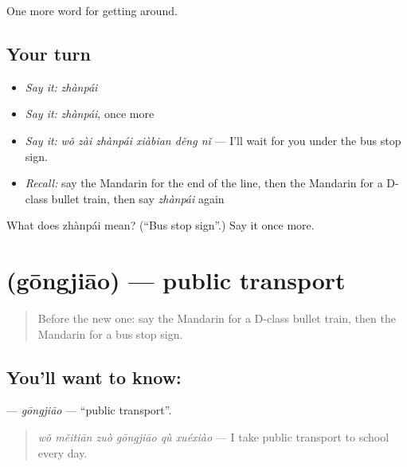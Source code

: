 \begin{grammarlens}[title={What you've built}]
One more word for getting around.
\end{grammarlens}

\subsection*{Your turn}
\begin{itemize}
\raggedright
  \item \emph{Say it:} \emph{zhànpái}
  \item \emph{Say it:} \emph{zhànpái}, once more
  \item \emph{Say it:} \emph{wǒ zài zhànpái xiàbian děng nǐ} — I'll wait for you under the bus stop sign.
  \item \emph{Recall:} say the Mandarin for the end of the line, then the Mandarin for a D-class bullet train, then say \emph{zhànpái} again
\end{itemize}

\begin{tcolorbox}[breakable,colback=teal!4,colframe=teal!35!black,title={Before you move on}]
What does zhànpái mean? (\textquotedblleft{}Bus stop sign\textquotedblright{}.) Say it once more.
\end{tcolorbox}
\section[\texorpdfstring{\zh{公交} (gōngjiāo)}{公交 (gōngjiāo)}]{ (gōngjiāo) — public transport}

\label{lesson:ZH-C408-gongjiao}



\begin{quote}
Before the new one: say the Mandarin for a D-class bullet train, then the Mandarin for a bus stop sign.
\end{quote}

\subsection*{You'll want to know: }
\textbf{} — \emph{gōngjiāo} — \textquotedblleft{}public transport\textquotedblright{}.

\begin{quote}
\textbf{} \emph{wǒ měitiān zuò gōngjiāo qù xuéxiào} — I take public transport to school every day.
\end{quote}

